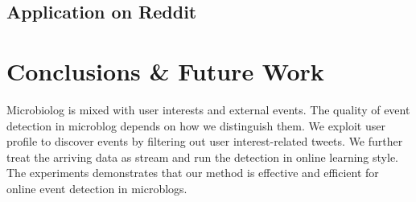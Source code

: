 \documentclass[11pt]{article}
\begin{document}
\subsection{Application on Reddit}

\section{Conclusions \& Future Work}
Microbiolog is mixed with user interests and external events.
The quality of event detection in microblog depends on how we distinguish them.
We exploit user profile to discover events by filtering out user interest-related tweets.
We further treat the arriving data as stream and run the detection in online learning style.
The experiments demonstrates that our method is effective and efficient for online event detection in microblogs.


  
\end{document}
